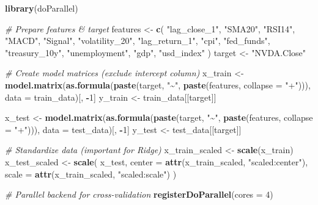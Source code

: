 \documentclass[
]{article}
\newenvironment{Shaded}{\begin{snugshade}}{\end{snugshade}}
\newcommand{\AttributeTok}[1]{\textcolor[rgb]{0.13,0.29,0.53}{#1}}
\newcommand{\CommentTok}[1]{\textcolor[rgb]{0.56,0.35,0.01}{\textit{#1}}}
\newcommand{\DecValTok}[1]{\textcolor[rgb]{0.00,0.00,0.81}{#1}}
\newcommand{\FunctionTok}[1]{\textcolor[rgb]{0.13,0.29,0.53}{\textbf{#1}}}
\newcommand{\NormalTok}[1]{#1}
\newcommand{\OtherTok}[1]{\textcolor[rgb]{0.56,0.35,0.01}{#1}}
\newcommand{\SpecialCharTok}[1]{\textcolor[rgb]{0.81,0.36,0.00}{\textbf{#1}}}
\newcommand{\StringTok}[1]{\textcolor[rgb]{0.31,0.60,0.02}{#1}}
\begin{document}
\begin{Shaded}
\begin{Highlighting}[]
\FunctionTok{library}\NormalTok{(doParallel)}

\CommentTok{\# Prepare features \& target}
\NormalTok{features }\OtherTok{\textless{}{-}} \FunctionTok{c}\NormalTok{(}
  \StringTok{"lag\_close\_1"}\NormalTok{, }\StringTok{"SMA20"}\NormalTok{, }\StringTok{"RSI14"}\NormalTok{, }\StringTok{"MACD"}\NormalTok{, }\StringTok{"Signal"}\NormalTok{,}
  \StringTok{"volatility\_20"}\NormalTok{, }\StringTok{"lag\_return\_1"}\NormalTok{,}
  \StringTok{"cpi"}\NormalTok{, }\StringTok{"fed\_funds"}\NormalTok{, }\StringTok{"treasury\_10y"}\NormalTok{, }\StringTok{"unemployment"}\NormalTok{,}
  \StringTok{"gdp"}\NormalTok{, }\StringTok{"usd\_index"}
\NormalTok{)}
\NormalTok{target }\OtherTok{\textless{}{-}} \StringTok{"NVDA.Close"}

\CommentTok{\#  Create model matrices (exclude intercept column)}
\NormalTok{x\_train }\OtherTok{\textless{}{-}} \FunctionTok{model.matrix}\NormalTok{(}\FunctionTok{as.formula}\NormalTok{(}\FunctionTok{paste}\NormalTok{(target, }\StringTok{"\textasciitilde{}"}\NormalTok{, }\FunctionTok{paste}\NormalTok{(features, }\AttributeTok{collapse =} \StringTok{"+"}\NormalTok{))), }\AttributeTok{data =}\NormalTok{ train\_data)[, }\SpecialCharTok{{-}}\DecValTok{1}\NormalTok{]}
\NormalTok{y\_train }\OtherTok{\textless{}{-}}\NormalTok{ train\_data[[target]]}

\NormalTok{x\_test }\OtherTok{\textless{}{-}} \FunctionTok{model.matrix}\NormalTok{(}\FunctionTok{as.formula}\NormalTok{(}\FunctionTok{paste}\NormalTok{(target, }\StringTok{"\textasciitilde{}"}\NormalTok{, }\FunctionTok{paste}\NormalTok{(features, }\AttributeTok{collapse =} \StringTok{"+"}\NormalTok{))), }\AttributeTok{data =}\NormalTok{ test\_data)[, }\SpecialCharTok{{-}}\DecValTok{1}\NormalTok{]}
\NormalTok{y\_test }\OtherTok{\textless{}{-}}\NormalTok{ test\_data[[target]]}

\CommentTok{\#  Standardize data (important for Ridge)}
\NormalTok{x\_train\_scaled }\OtherTok{\textless{}{-}} \FunctionTok{scale}\NormalTok{(x\_train)}
\NormalTok{x\_test\_scaled }\OtherTok{\textless{}{-}} \FunctionTok{scale}\NormalTok{(}
\NormalTok{  x\_test,}
  \AttributeTok{center =} \FunctionTok{attr}\NormalTok{(x\_train\_scaled, }\StringTok{"scaled:center"}\NormalTok{),}
  \AttributeTok{scale =} \FunctionTok{attr}\NormalTok{(x\_train\_scaled, }\StringTok{"scaled:scale"}\NormalTok{)}
\NormalTok{)}

\CommentTok{\#  Parallel backend for cross{-}validation}
\FunctionTok{registerDoParallel}\NormalTok{(}\AttributeTok{cores =} \DecValTok{4}\NormalTok{)}


\end{Highlighting}
\end{Shaded}
\end{document}
